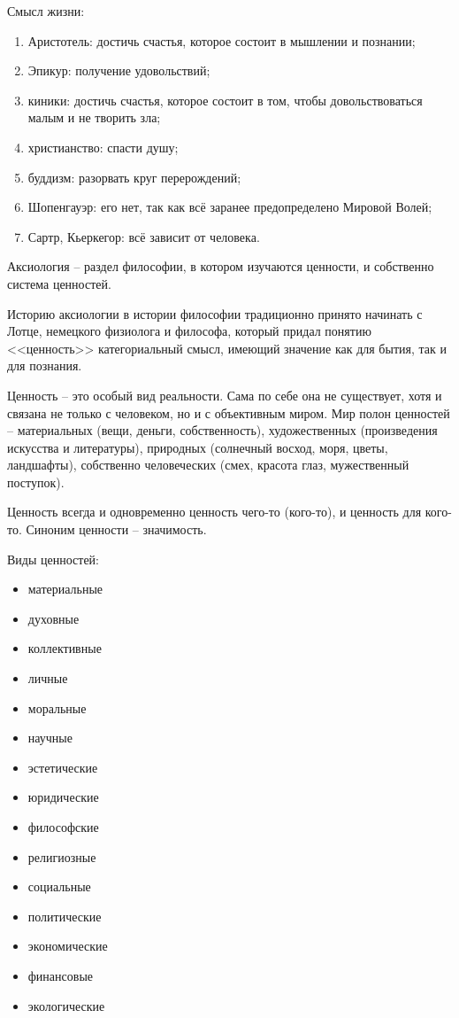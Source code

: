 
Смысл жизни:
\begin{enumerate}
	\item Аристотель: достичь счастья, которое состоит в мышлении и познании;
	\item Эпикур: получение удовольствий;
	\item киники: достичь счастья, которое состоит в том, чтобы довольствоваться малым и не творить зла;
	\item христианство: спасти душу;
	\item буддизм: разорвать круг перерождений;
	\item Шопенгауэр: его нет, так как всё заранее предопределено Мировой Волей;
	\item Сартр, Кьеркегор: всё зависит от человека.
\end{enumerate}

Аксиология -- раздел философии, в котором изучаются ценности, и собственно система ценностей.

Историю аксиологии в истории философии традиционно принято начинать с Лотце, немецкого физиолога и философа, который  придал понятию <<ценность>> категориальный смысл, имеющий значение как для бытия, так и для познания.

Ценность – это особый вид реальности. Сама по себе она не существует, хотя и связана не только с человеком, но и с объективным миром. Мир полон ценностей – материальных (вещи, деньги, собственность), художественных (произведения искусства и литературы), природных (солнечный восход, моря, цветы, ландшафты), собственно человеческих (смех, красота глаз, мужественный поступок).

Ценность всегда и одновременно ценность чего-то (кого-то), и ценность для кого-то. Синоним ценности -- значимость.

Виды ценностей:
\begin{itemize}
	\item материальные
	\item духовные
\end{itemize}

\begin{itemize}
	\item коллективные
	\item личные
\end{itemize}

\begin{itemize}
	\item моральные
	\item научные
	\item эстетические  
	\item юридические
	\item философские 
	\item религиозные 
	\item социальные
	\item политические
	\item экономические 
	\item финансовые
	\item экологические
\end{itemize}


